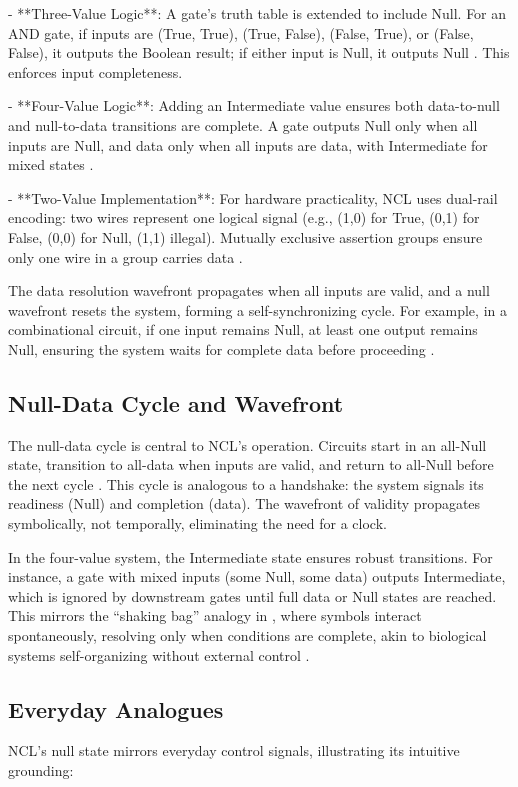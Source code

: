 \documentclass{article}
\begin{document}
- **Three-Value Logic**: A gate's truth table is extended to include Null. For an AND gate, if inputs are (True, True), (True, False), (False, True), or (False, False), it outputs the Boolean result; if either input is Null, it outputs Null \citep{fant2005}. This enforces input completeness.

- **Four-Value Logic**: Adding an Intermediate value ensures both data-to-null and null-to-data transitions are complete. A gate outputs Null only when all inputs are Null, and data only when all inputs are data, with Intermediate for mixed states \citep{fant2005}.

- **Two-Value Implementation**: For hardware practicality, NCL uses dual-rail encoding: two wires represent one logical signal (e.g., (1,0) for True, (0,1) for False, (0,0) for Null, (1,1) illegal). Mutually exclusive assertion groups ensure only one wire in a group carries data \citep{fant2005}.

The data resolution wavefront propagates when all inputs are valid, and a null wavefront resets the system, forming a self-synchronizing cycle. For example, in a combinational circuit, if one input remains Null, at least one output remains Null, ensuring the system waits for complete data before proceeding \citep{fant2005}.

\subsection{Null-Data Cycle and Wavefront}
The null-data cycle is central to NCL's operation. Circuits start in an all-Null state, transition to all-data when inputs are valid, and return to all-Null before the next cycle \citep{fant2005}. This cycle is analogous to a handshake: the system signals its readiness (Null) and completion (data). The wavefront of validity propagates symbolically, not temporally, eliminating the need for a clock.

In the four-value system, the Intermediate state ensures robust transitions. For instance, a gate with mixed inputs (some Null, some data) outputs Intermediate, which is ignored by downstream gates until full data or Null states are reached. This mirrors the ``shaking bag'' analogy in \citet{fant2005}, where symbols interact spontaneously, resolving only when conditions are complete, akin to biological systems self-organizing without external control \citep{schneider2005}.

\subsection{Everyday Analogues}
NCL's null state mirrors everyday control signals, illustrating its intuitive grounding:
\end{document}
